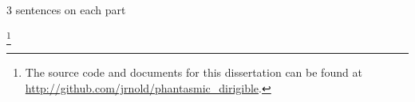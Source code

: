 
3 sentences on each part


\footnote{The source code and documents for this dissertation can be found at \url{http://github.com/jrnold/phantasmic_dirigible}.}

